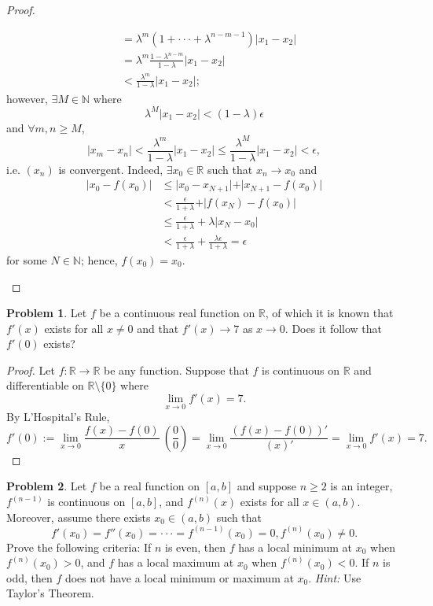 \documentclass{amsart}
\theoremstyle{definition}
\newtheorem{problem}{Problem}
\begin{document}
\begin{proof}
\begin{enumerate}[label = (\alph*)]
\begin{align*}
            &= \lambda^m(1 + \cdot \cdot \cdot + \lambda^{n-m-1})\vert x_1 - x_2 \vert \\
            &= \lambda^m\frac{1 - \lambda^{n-m}}{1-\lambda}\vert x_1 - x_2 \vert \\
            &< \frac{\lambda^m}{1 - \lambda}\vert x_1 - x_2 \vert;
        \end{align*}
        however, $\exists M \in \mathbb{N}$ where
        \[
        \lambda^M\vert x_1 - x_2 \vert < (1 - \lambda)\epsilon
        \]
        and $\forall m,n \geq M$,
        \[
        \vert x_m - x_n \vert < \frac{\lambda^m}{1 - \lambda}\vert x_1 - x_2 \vert \leq \frac{\lambda^M}{1 - \lambda}\vert x_1 - x_2 \vert < \epsilon,
        \]
        i.e. $(x_n)$ is convergent. Indeed, $\exists x_0 \in \mathbb{R}$ such that $x_n \to x_0$ and 
        \begin{align*}
            \vert x_0 - f(x_0) \vert &\leq \vert x_0 - x_{N+1} \vert + \vert x_{N+1} - f(x_0) \vert \\
            &< \frac{\epsilon}{1 + \lambda} + \vert f(x_N) - f(x_0) \vert \\
            &\leq \frac{\epsilon}{1 + \lambda} + \lambda \vert x_N - x_0 \vert \\
            &< \frac{\epsilon}{1 + \lambda} + \frac{\lambda\epsilon}{1 + \lambda} = \epsilon
        \end{align*}
        for some $N \in \mathbb{N}$; hence, $f(x_0) = x_0$.
    \end{enumerate}
\end{proof}

\begin{problem}
    Let $f$ be a continuous real function on $\mathbb{R}$, of which it is known that $f'(x)$ exists for all $x \neq 0$ and that $f'(x) \to 7$ as $x \to 0$. Does it follow that $f'(0)$ exists?
\end{problem}

\begin{proof}
    Let $f: \mathbb{R} \to \mathbb{R}$ be any function. Suppose that $f$ is continuous on $\mathbb{R}$ and differentiable on $\mathbb{R} \setminus \{0\}$ where 
    \[
    \lim_{x \to 0}f'(x) = 7.
    \]
    By L'Hospital's Rule,
    \[
    f'(0) := \lim_{x \to 0}\frac{f(x) - f(0)}{x} \ \left( \frac{0}{0} \right) = \lim_{x \to 0}\frac{(f(x) - f(0))'}{(x)'} = \lim_{x \to 0}f'(x) = 7.
    \]
\end{proof}

\begin{problem}
    Let $f$ be a real function on $[a,b]$ and suppose $n \geq 2$ is an integer, $f^{(n-1)}$ is continuous on $[a,b]$, and $f^{(n)}(x)$ exists for all $x \in (a,b)$. Moreover, assume there exists $x_0 \in (a,b)$ such that
    \[
    f'(x_0) = f''(x_0) = \cdot \cdot \cdot = f^{(n-1)}(x_0) = 0, f^{(n)}(x_0) \neq 0.    
    \]
    Prove the following criteria: If $n$ is even, then $f$ has a local minimum at $x_0$ when $f^{(n)}(x_0) > 0$, and $f$ has a local maximum at $x_0$ when $f^{(n)}(x_0) < 0$. If $n$ is odd, then $f$ does not have a local minimum or maximum at $x_0$. \textit{Hint:} Use Taylor’s Theorem.
\end{problem}
\end{document}
